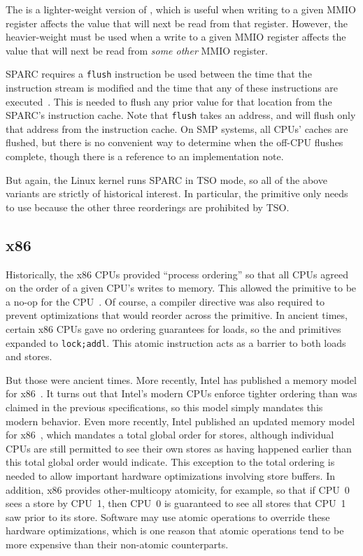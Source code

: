 The  is a lighter-weight version of
, which is useful when writing to a given MMIO register
affects the value that will next be read from that register.
However, the heavier-weight  must be used when
a write to a given MMIO register affects the value that will next be
read from {\em some other} MMIO register.

SPARC requires a {\tt flush} instruction be used between the time that
the instruction stream is modified and the time that any of these
instructions are executed~\cite{SPARC94}.
This is needed to flush any prior value for that location from
the SPARC's instruction cache.
Note that {\tt flush} takes an address, and will flush only that address
from the instruction cache.
On SMP systems, all CPUs' caches are flushed, but there is no
convenient way to determine when the off-CPU flushes complete,
though there is a reference to an implementation note.

But again, the Linux kernel runs SPARC in TSO mode, so
all of the above  variants are strictly of historical
interest.
In particular, the  primitive only needs to use 
because the other three reorderings are prohibited by TSO\@.

\subsection{x86}

Historically, the x86 CPUs provided ``process ordering'' so that all CPUs
agreed on the order of a given CPU's writes to memory.
This allowed the 
primitive to be a no-op for the CPU~\cite{IntelXeonV3-96a}.
Of course, a compiler directive was also required to prevent optimizations
that would reorder across the  primitive.
In ancient times, certain x86 CPUs gave no ordering guarantees for loads, so
the  and  primitives expanded to {\tt lock;addl}.
This atomic instruction acts as a barrier to both loads and stores.

But those were ancient times.
More recently, Intel has published a memory model for
x86~\cite{Intelx86MemoryOrdering2007}.
It turns out that Intel's modern CPUs enforce tighter ordering than was
claimed in the previous specifications, so this model simply mandates
this modern behavior.
Even more recently, Intel published an updated memory model for
x86~\cite[Section 8.2]{Intel64IA32v3A2011}, which mandates a total global order
for stores, although individual CPUs are still permitted to see their
own stores as having happened earlier than this total global order
would indicate.
This exception to the total ordering is needed to allow important
hardware optimizations involving store buffers.
In addition, x86 provides other-multicopy atomicity, for example,
so that if CPU~0 sees a store by CPU~1, then CPU~0 is guaranteed to see
all stores that CPU~1 saw prior to its store.
Software may use atomic operations to override these hardware optimizations,
which is one reason that atomic operations tend to be more expensive
than their non-atomic counterparts.

